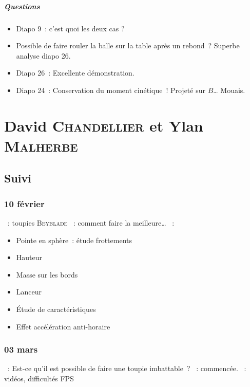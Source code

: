 \documentclass[a4paper, 11pt, final, garamond]{book}
\begin{document}
\paragraph*{Questions}
\begin{itemize}
  \item Diapo 9~: c'est quoi les deux cas ?
  \item Possible de faire rouler la balle sur la table après un rebond~? Superbe
    analyse diapo 26.
  \item Diapo 26~: Excellente démonstration.
  \item Diapo 24~: Conservation du moment cinétique~! Projeté sur $B$… Mouais.
\end{itemize}

\chapter{David \textsc{Chandellier} et Ylan \textsc{Malherbe}}
\label{ch:davidylan}
\section{Suivi}
\subsection{10 février}
\begin{itemize}
    ~: toupies \textsc{Beyblade}
    ~: comment faire la meilleure…
    ~: 
        \begin{itemize}
            \item Pointe en sphère~: étude frottements
            \item Hauteur
            \item Masse sur les bords
            \item Lanceur
            \item Étude de caractéristiques
            \item Effet accélération anti-horaire
        \end{itemize}
\end{itemize}

\subsection{03 mars}
\begin{itemize}
    ~: Est-ce qu'il est possible de faire une toupie imbattable~?
    ~: commencée.
    ~: vidéos, difficultés FPS
\end{itemize}
\end{document}
